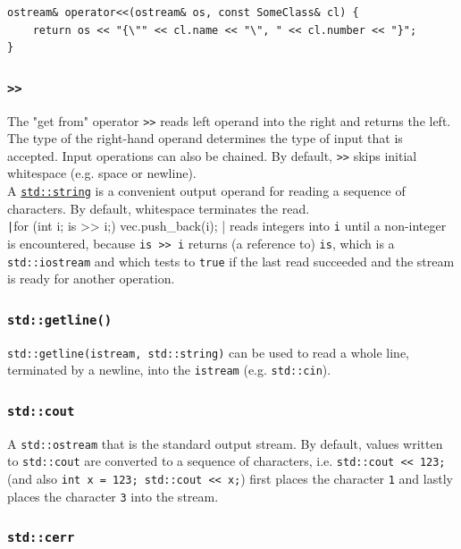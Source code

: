 \documentclass[table, xcdraw]{article}%
\begin{document}
\begin{verbatim}
ostream& operator<<(ostream& os, const SomeClass& cl) {
    return os << "{\"" << cl.name << "\", " << cl.number << "}";
}
\end{verbatim}

\subsubsection{\texttt{>>}}
The "get from" operator \texttt{>>} reads left operand into the right and returns the left. The type of the right-hand operand determines the type of input that is accepted. Input operations can also be chained. By default,
\texttt{>>} skips initial whitespace (e.g. space or newline).\\
A \hyperref[string]{\texttt{std::string}} is a convenient output operand for reading a sequence of characters. By default, whitespace terminates the read.\\
\texttt|for (int i; is >> i;) { vec.push_back(i); }| reads integers into \texttt{i} until a non-integer is encountered, because \texttt{is >> i} returns (a reference to) \texttt{is}, which is a \texttt{std::iostream} and which tests to \texttt{true} if the last read succeeded and the stream is ready for another operation.

\subsubsection{\texttt{std::getline()}}

\texttt{std::getline(istream, std::string)} can be used to read a whole line, terminated by a newline, into the \texttt{istream} (e.g. \texttt{std::cin}).

\subsubsection{\texttt{std::cout}}

A \texttt{std::ostream} that is the standard output stream. By default, values written to \texttt{std::cout} are converted to a sequence of characters, i.e. \texttt{std::cout << 123;} (and also \texttt{int x = 123; std::cout << x;}) first places the character \texttt{1} and lastly places the character \texttt{3} into the stream. 

\subsubsection{\texttt{std::cerr}}
\end{document}
